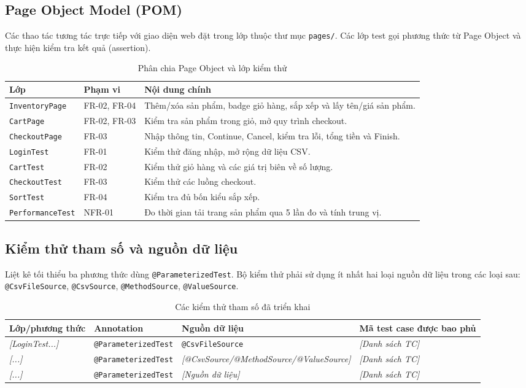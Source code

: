 \documentclass[a4paper,12pt]{article}
\newcommand{\fillin}[1]{\textit{[#1]}}
\begin{document}
\subsection{Page Object Model (POM)}
Các thao tác tương tác trực tiếp với giao diện web đặt trong lớp thuộc thư mục \texttt{pages/}. Các lớp test gọi phương thức từ Page Object và thực hiện kiểm tra kết quả (assertion).
\begin{table}[htbp]
\centering
\caption{Phân chia Page Object và lớp kiểm thử}
\begin{tabularx}{\textwidth}{|p{3.3cm}|p{4cm}|X|}
\hline
\textbf{Lớp} & \textbf{Phạm vi} & \textbf{Nội dung chính} \\
\hline
\texttt{InventoryPage} & FR-02, FR-04 & Thêm/xóa sản phẩm, badge giỏ hàng, sắp xếp và lấy tên/giá sản phẩm. \\
\hline
\texttt{CartPage} & FR-02, FR-03 & Kiểm tra sản phẩm trong giỏ, mở quy trình checkout. \\
\hline
\texttt{CheckoutPage} & FR-03 & Nhập thông tin, Continue, Cancel, kiểm tra lỗi, tổng tiền và Finish. \\
\hline
\texttt{LoginTest} & FR-01 & Kiểm thử đăng nhập, mở rộng dữ liệu CSV. \\
\hline
\texttt{CartTest} & FR-02 & Kiểm thử giỏ hàng và các giá trị biên về số lượng. \\
\hline
\texttt{CheckoutTest} & FR-03 & Kiểm thử các luồng checkout. \\
\hline
\texttt{SortTest} & FR-04 & Kiểm tra đủ bốn kiểu sắp xếp. \\
\hline
\texttt{PerformanceTest} & NFR-01 & Đo thời gian tải trang sản phẩm qua 5 lần đo và tính trung vị. \\
\hline
\end{tabularx}
\end{table}

\subsection{Kiểm thử tham số và nguồn dữ liệu}
Liệt kê tối thiểu ba phương thức dùng \texttt{@ParameterizedTest}. Bộ kiểm thử phải sử dụng ít nhất hai loại nguồn dữ liệu trong các loại sau: \texttt{@CsvFileSource}, \texttt{@CsvSource}, \texttt{@MethodSource}, \texttt{@ValueSource}.
\begin{table}[htbp]
\centering
\caption{Các kiểm thử tham số đã triển khai}
\begin{tabularx}{\textwidth}{|p{2.2cm}|p{2.8cm}|p{3cm}|X|}
\hline
\textbf{Lớp/phương thức} & \textbf{Annotation} & \textbf{Nguồn dữ liệu} & \textbf{Mã test case được bao phủ} \\
\hline
\fillin{LoginTest...} & \texttt{@ParameterizedTest} & \texttt{@CsvFileSource} & \fillin{Danh sách TC} \\
\hline
\fillin{...} & \texttt{@ParameterizedTest} & \fillin{@CsvSource/@MethodSource/@ValueSource} & \fillin{Danh sách TC} \\
\hline
\fillin{...} & \texttt{@ParameterizedTest} & \fillin{Nguồn dữ liệu} & \fillin{Danh sách TC} \\
\hline
\end{tabularx}
\end{table}
\end{document}
